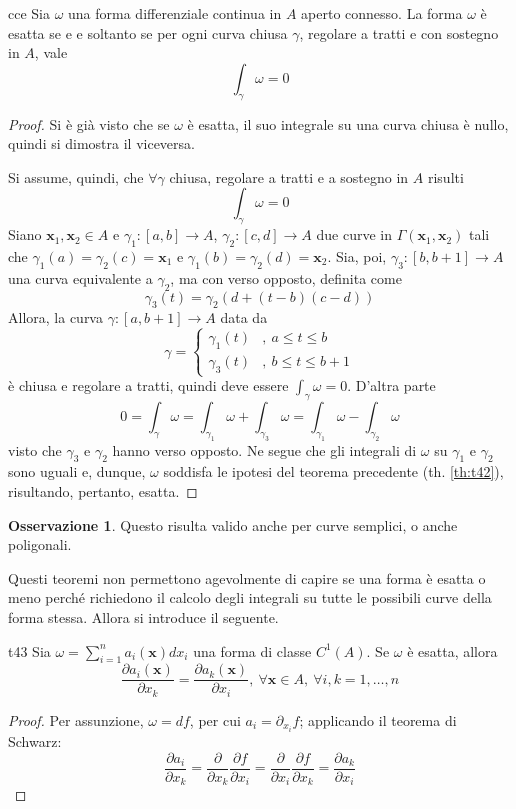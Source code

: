 \documentclass[10pt, a4paper]{scrartcl}
\theoremstyle{definition}
\numberwithin{esempio}{section}
\theoremstyle{definition}
\newtheorem{obs}{Osservazione}
\numberwithin{obs}{section}
\numberwithin{nota}{section}
\numberwithin{equation}{subsection}
\begin{document}
\begin{teorema}
	{}{cce}
	Sia $\omega$ una forma differenziale continua in $A$ aperto connesso.
	La forma $\omega$ \`e esatta se e e soltanto se per ogni curva chiusa $\gamma$, regolare a tratti e con sostegno in $A$, vale
	\[
	\int_{\gamma} \omega = 0 
	\] 
	\begin{proof}
		Si \`e gi\`a visto che se $\omega$ \`e esatta, il suo integrale su una curva chiusa \`e nullo, quindi si dimostra il viceversa.

		Si assume, quindi, che $ \forall \gamma$ chiusa, regolare a tratti e a sostegno in $A$ risulti
		\[
		\int_{\gamma} \omega = 0
		\] 
		Siano $\mathbf{x} _1, \mathbf{x} _2 \in A$ e $\gamma_1 :\left[ a,b \right] \to A$, $\gamma_2:\left[ c,d \right] \to A$ due curve in $\Gamma(\mathbf{x} _1,\mathbf{x} _2)$ tali che $\gamma_1(a) = \gamma_2(c)=\mathbf{x} _1$ e $\gamma_1(b) = \gamma_2(d) = \mathbf{x} _2$.
		Sia, poi, $\gamma_3:\left[ b,b+1 \right] \to A$ una curva equivalente a $\gamma_2$, ma con verso opposto, definita come
		\[
		\gamma_3(t) = \gamma_2(d+(t-b)(c-d))
		\] 
		Allora, la curva $\gamma:\left[ a,b+1 \right] \to A$ data da
		\[
		\gamma = \begin{cases}
			\gamma_1(t) &,\ a\le t\le b\\
			\gamma_3(t) &,\ b\le t\le b+1
		\end{cases}
		\] 
		\`e chiusa e regolare a tratti, quindi deve essere $\int_{\gamma} \omega = 0$. 
		D'altra parte
		\[
		0 = \int_{\gamma} \omega = \int_{\gamma_1} \omega + \int_{\gamma_3} \omega = \int_{\gamma_1} \omega - \int_{\gamma_2} \omega
		\] 
		visto che $\gamma_3$ e $\gamma_2$ hanno verso opposto.
		Ne segue che gli integrali di $\omega$ su $\gamma_1$ e $\gamma_2$ sono uguali e, dunque, $\omega$ soddisfa le ipotesi del teorema precedente (th. \ref{th:t42}), risultando, pertanto, esatta.
	\end{proof}
\end{teorema}
\begin{obs}\label{o42}
 Questo risulta valido anche per curve semplici, o anche poligonali.
\end{obs}
Questi teoremi non permettono agevolmente di capire se una forma \`e esatta o meno perch\'e richiedono il calcolo degli integrali su tutte le possibili curve della forma stessa.
Allora si introduce il seguente.
\begin{teorema}
	{}{t43}
	Sia $\omega = \sum_{i=1}^{n} a_i(\mathbf{x} ) dx_i$ una forma di classe $C^1(A)$. Se $\omega$ \`e esatta, allora 
	\[
	\frac{\partial a_i(\mathbf{x} )}{\partial x_k} = \frac{\partial a_k(\mathbf{x} )}{\partial x_i} , \ \forall \mathbf{x} \in A, \ \forall i,k=1,\ldots,n
	\] 
	\begin{proof}
		Per assunzione, $\omega = df$, per cui $a_i =  \partial _{x_i} f$; applicando il teorema di Schwarz:
		\[
		\frac{\partial a_i}{\partial x_k} = \frac{\partial }{\partial x_k} \frac{\partial f}{\partial x_i} = \frac{\partial }{\partial x_i} \frac{\partial f}{\partial x_k} = \frac{\partial a_k}{\partial x_i} 
		\] 
	\end{proof}
\end{teorema}
\end{document}
